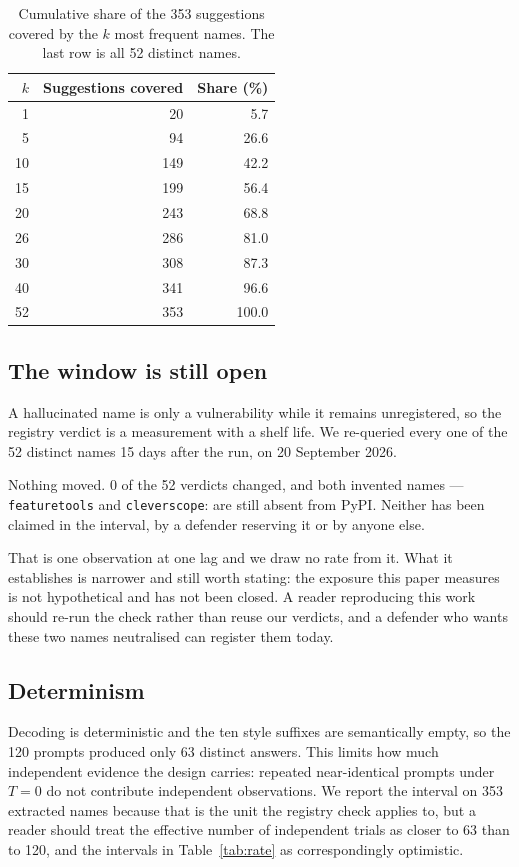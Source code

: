 \documentclass[journal]{IEEEtran}
\theoremstyle{definition}
\newcommand{\Nprompts}{120}
\newcommand{\Npkg}{353}
\newcommand{\Ndistinctpkg}{52}
\newcommand{\Ndistinctout}{63}
\newcommand{\Recheckdays}{15}
\newcommand{\Recheckn}{52}
\newcommand{\Recheckflips}{0}
\newcommand{\Recheckdate}{20 September 2026}
\begin{document}
\begin{table}[t]
\caption{Cumulative share of the \Npkg{} suggestions covered by the $k$ most
frequent names. The last row is all \Ndistinctpkg{} distinct names.}
\label{tab:cover}
\centering
\small
\setlength{\tabcolsep}{6pt}
\begin{tabular}{@{}rrr@{}}
\toprule
$k$ & Suggestions covered & Share (\%) \\
\midrule
1 & 20 & 5.7 \\
5 & 94 & 26.6 \\
10 & 149 & 42.2 \\
15 & 199 & 56.4 \\
20 & 243 & 68.8 \\
26 & 286 & 81.0 \\
30 & 308 & 87.3 \\
40 & 341 & 96.6 \\
52 & 353 & 100.0 \\
\bottomrule
\end{tabular}
\end{table}

\subsection{The window is still open}
\label{sec:recheck}

A hallucinated name is only a vulnerability while it remains unregistered, so
the registry verdict is a measurement with a shelf life. We re-queried every
one of the \Recheckn{} distinct names \Recheckdays{} days after the run, on
\Recheckdate.

Nothing moved. \Recheckflips{} of the \Recheckn{} verdicts changed, and both
invented names --- \texttt{feature\-tools} and \texttt{cleverscope}: are
still absent from PyPI. Neither has been claimed in the interval, by a defender
reserving it or by anyone else.

That is one observation at one lag and we draw no rate from it. What it
establishes is narrower and still worth stating: the exposure this paper
measures is not hypothetical and has not been closed. A reader reproducing this
work should re-run the check rather than reuse our verdicts, and a defender who
wants these two names neutralised can register them today.

\subsection{Determinism}

Decoding is deterministic and the ten style suffixes are semantically empty, so
the \Nprompts{} prompts produced only \Ndistinctout{} distinct answers. This
limits how much independent evidence the design carries: repeated
near-identical prompts under $T=0$ do not contribute independent observations.
We report the interval on \Npkg{} extracted names because that is the unit the
registry check applies to, but a reader should treat the effective number of
independent trials as closer to \Ndistinctout{} than to \Nprompts{}, and the
intervals in Table~\ref{tab:rate} as correspondingly optimistic.
\end{document}
